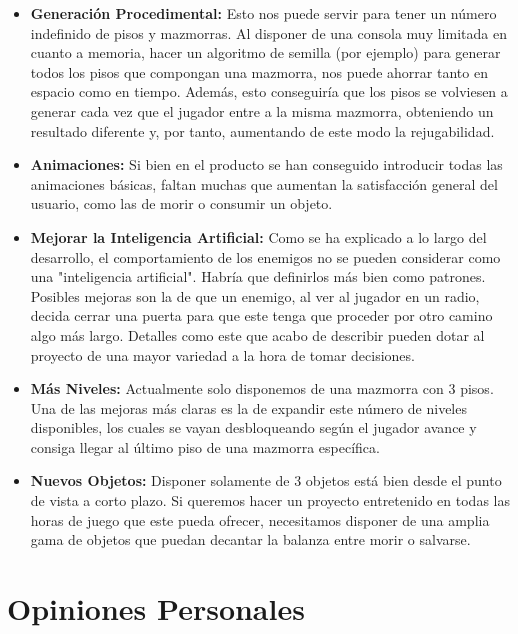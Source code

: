 \begin{itemize}
		\item \textbf{Generación Procedimental:} Esto nos puede servir para tener un número indefinido de pisos y mazmorras. Al disponer de una consola muy limitada en cuanto a memoria, hacer un algoritmo de semilla (por ejemplo) para generar todos los pisos que compongan una mazmorra, nos puede ahorrar tanto en espacio como en tiempo. Además, esto conseguiría que los pisos se volviesen a generar cada vez que el jugador entre a la misma mazmorra, obteniendo un resultado diferente y, por tanto, aumentando de este modo la rejugabilidad.
		
		\item \textbf{Animaciones:} Si bien en el producto se han conseguido introducir todas las animaciones básicas, faltan muchas que aumentan la satisfacción general del usuario, como las de morir o consumir un objeto.
		
		\item \textbf{Mejorar la Inteligencia Artificial:} Como se ha explicado a lo largo del desarrollo, el comportamiento de los enemigos no se pueden considerar como una "inteligencia artificial". Habría que definirlos más bien como patrones. Posibles mejoras son la de que un enemigo, al ver al jugador en un radio, decida cerrar una puerta para que este tenga que proceder por otro camino algo más largo. Detalles como este que acabo de describir pueden dotar al proyecto de una mayor variedad a la hora de tomar decisiones.
		
		\item \textbf{Más Niveles:} Actualmente solo disponemos de una mazmorra con 3 pisos. Una de las mejoras más claras es la de expandir este número de niveles disponibles, los cuales se vayan desbloqueando según el jugador avance y consiga llegar al último piso de una mazmorra específica.
	
	\item \textbf{Nuevos Objetos:} Disponer solamente de 3 objetos está bien desde el punto de vista a corto plazo. Si queremos hacer un proyecto entretenido en todas las horas de juego que este pueda ofrecer, necesitamos disponer de una amplia gama de objetos que puedan decantar la balanza entre morir o salvarse.
	\end{itemize}

\section{Opiniones Personales}

